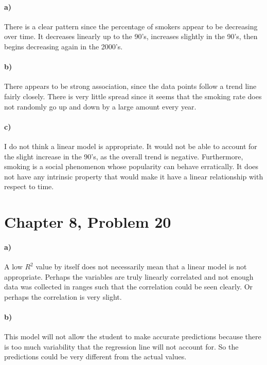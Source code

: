 \documentclass[12pt]{article}
\begin{document}
\paragraph{a)}

There is a clear pattern since the percentage of smokers appear to be decreasing over time.
It decreases linearly up to the 90's, increases slightly in the 90's, then begins decreasing
again in the 2000's.

\paragraph{b)}

There appears to be strong association, since the data points follow a trend line fairly closely.
There is very little spread since it seems that the smoking rate does not randomly go up and
down by a large amount every year.

\paragraph{c)}

I do not think a linear model is appropriate. It would not be able to account for the slight
increase in the 90's, as the overall trend is negative. Furthermore, smoking is a social
phenomenon whose popularity can behave erratically. It does not have any intrinsic property
that would make it have a linear relationship with respect to time.

\section*{Chapter 8, Problem 20}

\paragraph{a)}

A low \(R^2\) value by itself does not necessarily mean that a linear model is not appropriate.
Perhaps the variables are truly linearly correlated and not enough data was collected
in ranges such that the correlation could be seen clearly. Or perhaps the correlation is very slight.

\paragraph{b)}

This model will not allow the student to make accurate predictions because there is too much variability
that the regression line will not account for. So the predictions could be very different from the actual
values.
\end{document}
